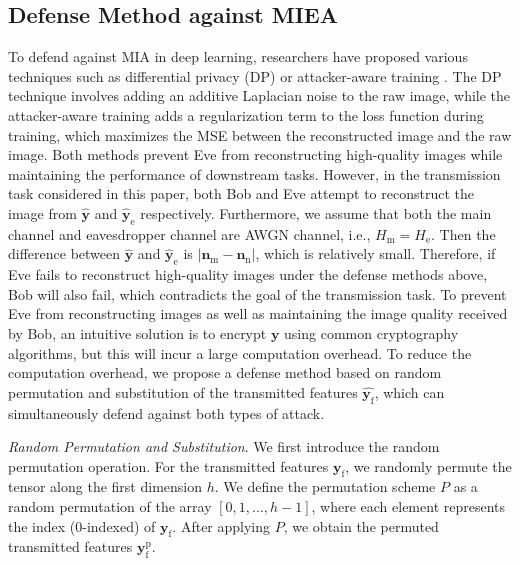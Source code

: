 \documentclass[conference]{IEEEtran}
\begin{document}
\subsection{Defense Method against MIEA}
To defend against MIA in deep learning, researchers have proposed various techniques such as differential privacy (DP)\cite{he2020attacking} or attacker-aware training \cite{li2022ressfl}. The DP technique involves adding an additive Laplacian noise to the raw image, while the attacker-aware training adds a regularization term to the loss function during training, which maximizes the MSE between the reconstructed image and the raw image. Both methods prevent Eve from reconstructing high-quality images while maintaining the performance of downstream tasks. However, in the transmission task considered in this paper, both Bob and Eve attempt to reconstruct the image from $\hat{\boldsymbol{y}}$ and $\hat{\boldsymbol{y}}_\mathrm{e}$ respectively. Furthermore, we assume that both the main channel and eavesdropper channel are AWGN channel, i.e., $H_\mathrm{m} = H_\mathrm{e}$. Then the difference between $\hat{\boldsymbol{y}}$ and $\hat{\boldsymbol{y}}_\mathrm{e}$ is $\vert \boldsymbol{n}_\mathrm{m} - \boldsymbol{n}_\mathrm{n} \vert$, which is relatively small. Therefore, if Eve fails to reconstruct high-quality images under the defense methods above, Bob will also fail, which contradicts the goal of the transmission task. To prevent Eve from reconstructing images as well as maintaining the image quality received by Bob, an intuitive solution is to encrypt $\boldsymbol{y}$ using common cryptography algorithms, but this will incur a large computation overhead. To reduce the computation overhead, we propose a defense method based on random permutation and substitution of the transmitted features $\hat{\boldsymbol{y}_\mathrm{f}}$, which can simultaneously defend against both types of attack. 

\emph{Random Permutation and Substitution}. We first introduce the random permutation operation. For the transmitted features $\boldsymbol{y}_\mathrm{f}$, we randomly permute the tensor along the first dimension $h$. We define the permutation scheme $P$ as a random permutation of the array $[0,1,...,h-1]$, where each element represents the index (0-indexed) of $\boldsymbol{y}_\mathrm{f}$. After applying $P$, we obtain the permuted transmitted features $\boldsymbol{y}^\mathrm{p}_\mathrm{f}$. 
\end{document}

